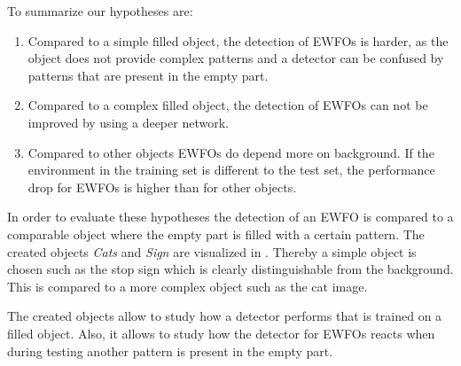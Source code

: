 To summarize our hypotheses are:
\begin{enumerate}
	\item Compared to a simple filled object, the detection of \acp{EWFO} is harder, as the object does not provide complex patterns and a detector can be confused by patterns that are present in the empty part. 
	\item Compared to a complex filled object, the detection of \acp{EWFO} can not be improved by using a deeper network.
	\item Compared to other objects \acp{EWFO} do depend more on background. If the environment in the training set is different to the test set, the performance drop for \acp{EWFO} is higher than for other objects. 
\end{enumerate}

In order to evaluate these hypotheses the detection of an \ac{EWFO} is compared to a comparable object where the empty part is filled with a certain pattern. The created objects \textit{Cats} and \textit{Sign} are visualized in . Thereby a simple object is chosen such as the stop sign which is clearly distinguishable from the background. This is compared to a more complex object such as the cat image.

The created objects allow to study how a detector performs that is trained on a filled object. Also, it allows to study how the detector for \acp{EWFO} reacts when during testing another pattern is present in the empty part.

